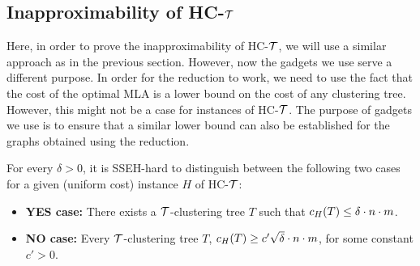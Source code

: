\subsection{Inapproximability of \textsc{HC-$\mathcal{T}$}}

Here, in order to prove the inapproximability of \textsc{HC-$\mathcal{T}$}, we will use a similar approach as in the previous section. However, now the gadgets we use serve a different purpose. In order for the reduction to work, we need to use the fact that the cost of the optimal \textsc{MLA} is a lower bound on the cost of any clustering tree. However, this might not be a case for instances of \textsc{HC-$\mathcal{T}$}. The purpose of gadgets we use is to ensure that a similar lower bound can also be established for the graphs obtained using the reduction.
\begin{theorem}\label{thm:hac-inapproximability}
    For every $\delta > 0$, it is \textsc{SSEH}-hard to distinguish between the following two cases for a given (uniform cost) instance $H$ of \textsc{HC-$\mathcal{T}$}:
    \begin{itemize}
        \item \textbf{YES case:} There exists a $\mathcal{T}$-clustering tree $T$ such that ${c}_H\mathopen{}\left( T \right)\leq \delta \cdot n \cdot m$.
        \item \textbf{NO case:} Every $\mathcal{T}$-clustering tree $T$, ${c}_H\mathopen{}\left( T \right)\geq c'\sqrt{\delta} \cdot n \cdot m$, for some constant $c' > 0$.
    \end{itemize}
\end{theorem}

